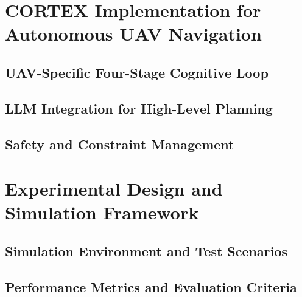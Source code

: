 \section{CORTEX Implementation for Autonomous UAV Navigation}

\subsection{UAV-Specific Four-Stage Cognitive Loop}

\subsection{LLM Integration for High-Level Planning}

\subsection{Safety and Constraint Management}

\section{Experimental Design and Simulation Framework}

\subsection{Simulation Environment and Test Scenarios}

\subsection{Performance Metrics and Evaluation Criteria}

